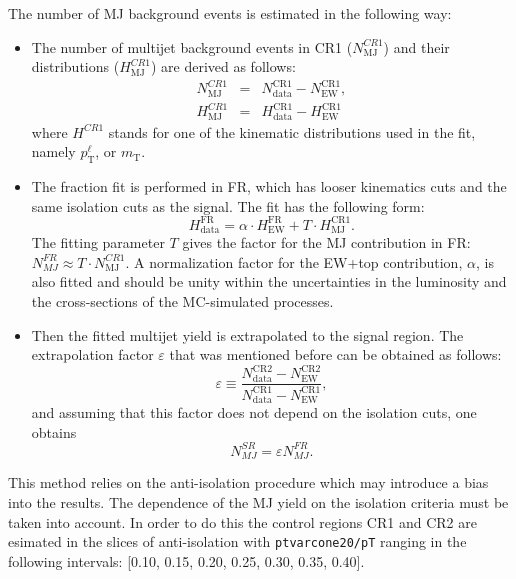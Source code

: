  The number of MJ background events is estimated in the following way:
 \begin{itemize}
  \item The number of multijet background events in CR1 ($N_\text{MJ}^{CR1}$) and their distributions ($H_\text{MJ}^{CR1}$) are derived as follows:
 \begin{eqnarray}
 N_\text{MJ}^{CR1} &=&  N_\text{data}^\text{CR1}-N_\text{EW}^\text{CR1},\\ 
 H_\text{MJ}^{CR1} &=&  H_\text{data}^\text{CR1}-H_\text{EW}^\text{CR1} 
 \end{eqnarray}
 where $H^{CR1}$ stands for one of the kinematic distributions used in the fit, namely $p_\text{T}^\ell$, \met or $m_\text{T}$. 
 
 \item The fraction fit is performed in FR, which has looser kinematics cuts and the same isolation cuts as the signal. The fit has the following form:
 \begin{equation}
 H_\text{data}^\text{FR} = \alpha \cdot H_\text{EW}^\text{FR} + T \cdot H_\text{MJ}^\text{CR1}.
 \label{eq:mjfit1}
 \end{equation}
 The fitting parameter $T$ gives the factor for the MJ contribution in FR:  $N_{MJ}^{FR} \approx T \cdot N_\text{MJ}^{CR1}$. A normalization factor for the EW+top contribution, $\alpha$, is also fitted and should be unity within the uncertainties in the luminosity and the cross-sections of the MC-simulated processes.
 
 \item Then the fitted multijet yield is extrapolated to the signal region. The extrapolation factor $\varepsilon$ that was mentioned before can be obtained as follows:
 \begin{equation}
 \varepsilon \equiv \frac{N_\text{data}^\text{CR2}-N_\text{EW}^\text{CR2}}{N_\text{data}^\text{CR1}-N_\text{EW}^\text{CR1}},
 \label{eq:mjfit2}
 \end{equation}
 and assuming that this factor does not depend on the isolation cuts, one obtains
 \begin{equation}
 N_{MJ}^{SR} = \varepsilon N_{MJ}^{FR}.
 \end{equation}
\end{itemize}
 This method relies on the anti-isolation procedure which may introduce a bias into the results. The dependence of the MJ yield on the isolation criteria must be taken into account. In order to do this the control regions CR1 and CR2 are esimated in the slices of anti-isolation with \texttt{ptvarcone20/pT} ranging in the following intervals: [0.10, 0.15, 0.20, 0.25, 0.30, 0.35, 0.40].\\
